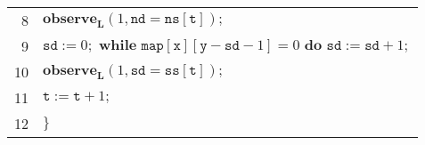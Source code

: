 \documentclass{llncs}
\begin{document}
\begin{center}
\begin{tabular}{rl}
8	& \hspace{20pt}	$\textbf{observe}_{\textbf{L}}(1, \texttt{nd} = \texttt{ns}[\texttt{t}]);$ \\
9	& \hspace{20pt}	$\texttt{sd} := 0; \textbf{ while }\texttt{map}[\texttt{x}][\texttt{y} - \texttt{sd} - 1] = 0\textbf{ do }\texttt{sd} := \texttt{sd} + 1;$ \\
10	& \hspace{20pt}	$\textbf{observe}_{\textbf{L}}(1, \texttt{sd} = \texttt{ss}[\texttt{t}]);$ \\
11	& \hspace{20pt}	$\texttt{t} := \texttt{t} + 1;$\\
12	& $\}$ \\
\hline
\end{tabular} 
\end{center} 
\end{document}
